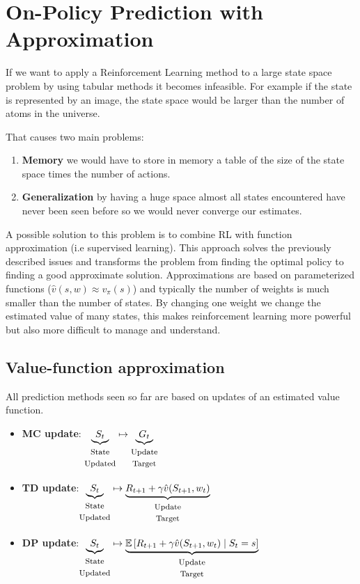 \newcommand{\splittedtext}[2]{\begin{matrix}\mbox{\footnotesize#1}\\\mbox{\footnotesize#2}\end{matrix}}

\section{On-Policy Prediction with Approximation}
If we want to apply a Reinforcement Learning method to a large state space problem by using tabular methods it becomes infeasible.
For example if the state is represented by an image, the state space would be larger than the number of atoms in the universe.

That causes two main problems:

\begin{enumerate}
    \item \textbf{Memory} we would have to store in memory a table of the size of the state space times the number of actions.
    \item \textbf{Generalization} by having a huge space almost all states encountered have never been seen before so we would never converge our estimates.
\end{enumerate}

A possible solution to this problem is to combine RL with function approximation (i.e supervised learning).
This approach solves the previously described issues and transforms the problem from finding the optimal policy to finding a good approximate solution. 
Approximations are based on parameterized functions ($\hat{v}(s,w)\approx v_\pi(s)$) and typically the number of weights is much smaller than the number of states.
By changing one weight we change the estimated value of many states, this makes reinforcement learning more powerful but
also more difficult to manage and understand.

\subsection{Value-function approximation}
All prediction methods seen so far are based on updates of an
estimated value function.
\begin{itemize}
    \item \textbf{MC update}: $\underbrace{S_t}_{\splittedtext{State}{Updated}}\mapsto \underbrace{G_t}_{\splittedtext{Update}{Target}}$
    \item \textbf{TD update}:$\underbrace{S_t}_{\splittedtext{State}{Updated}}\mapsto \underbrace{R_{t+1}+\gamma\hat{v}(S_{t+1}, w_t)}_{\splittedtext{Update}{Target}}$
    \item \textbf{DP update}:$\underbrace{S_t}_{\splittedtext{State}{Updated}}\mapsto \underbrace{\EX{[R_{t+1}+\gamma\hat{v}(S_{t+1}, w_t)\;|\;S_t=s]}}_{\splittedtext{Update}{Target}}$
\end{itemize}

